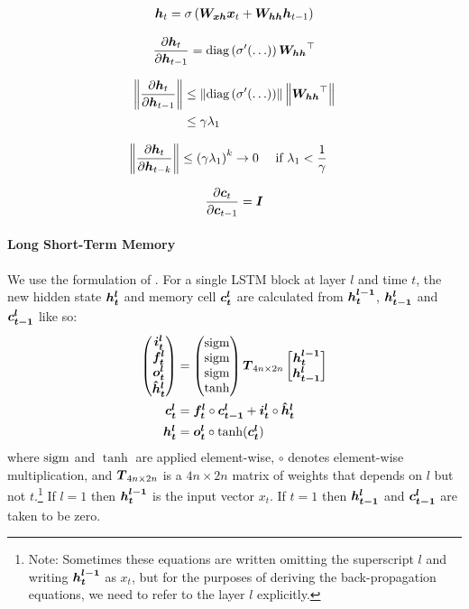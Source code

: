 \cite{pascanu13}

\begin{align}
\mbox{\boldmath{$h$}}_t = \sigma \left(
\mbox{\boldmath{$W_{xh}$}}\mbox{\boldmath{$x$}}_t + \mbox{\boldmath{$W_{hh}$}}\mbox{\boldmath{$h$}}_{t-1}
\right)
\end{align}

\begin{align}
\frac{\partial \mbox{\boldmath{$h$}}_t}{\partial \mbox{\boldmath{$h$}}_{t-1}} = \text{diag}\left(\sigma'(\ldots)\right)\mbox{\boldmath{$\mbox{\boldmath{$W_{hh}$}}$}}^\top
\end{align}

\begin{align}
\left\lVert\frac{\partial \mbox{\boldmath{$h$}}_t}{\partial \mbox{\boldmath{$h$}}_{t-1}}\right\rVert & \leq \left\lVert\text{diag}\left(\sigma'(\ldots)\right)\right\rVert 
\left\lVert\mbox{\boldmath{$\mbox{\boldmath{$W_{hh}$}}$}}^\top\right\rVert \\ 
& \leq \gamma \lambda_1
\end{align}

\begin{align}
\left\lVert\frac{\partial \mbox{\boldmath{$h$}}_t}{\partial \mbox{\boldmath{$h$}}_{t-k}}\right\rVert \leq \left(\gamma \lambda_1\right)^{k}
\rightarrow 0 & \quad \text{ if } \lambda_1 < \frac{1}{\gamma}
\end{align}

\begin{align}
\frac{\partial \mbox{\boldmath{$c$}}_t}{\partial \mbox{\boldmath{$c$}}_{t-1}} = \mbox{\boldmath{$I$}}
\end{align}

\paragraph{Long Short-Term Memory}
We use the formulation of \cite{zaremba14}.
For a single LSTM block at layer $l$ and time $t$, the new hidden state $\mbox{\boldmath{$h^l_t$}}$ and memory cell $\mbox{\boldmath{$c^l_t$}}$ are calculated from $\mbox{\boldmath{$h_t^{l-1}$}}$, $\mbox{\boldmath{$h_{t-1}^l$}}$ and $\mbox{\boldmath{$c_{t-1}^l$}}$ like so:
\begin{align}
\label{eqn:LSTMdef1}
\begin{pmatrix}
\ilt \\
\flt \\
\olt \\
\glt
\end{pmatrix}
&= 
\begin{pmatrix}
\sigm \\
\sigm \\
\sigm \\
\tanh
\end{pmatrix}
\MB{T}_{4n \times 2n}
\begin{bmatrix}
  \MB{h_t^{l-1}} \\
  \MB{h_{t-1}^l}
 \end{bmatrix} \\
\clt &= \flt \circ \MB{c_{t-1}^l} + \ilt \circ \glt \\
\hlt &= \olt \circ \tanh(\clt)
\end{align}
where $\operatorname{sigm}$ and $\tanh$ are applied element-wise, $\circ$ denotes element-wise multiplication, 
and $\mbox{\boldmath{$T$}}_{4n \times 2n}$ is a $4n \times 2n$ matrix of weights that depends on $l$ but not $t$.\footnote{Note: Sometimes these equations are written omitting the superscript $l$ and writing $\mbox{\boldmath{$h_t^{l-1}$}}$ as $x_t$, but for the purposes of deriving the back-propagation equations, we need to refer to the layer $l$ explicitly.}
If $l=1$ then $\mbox{\boldmath{$h_t^{l-1}$}}$ is the input vector $x_t$.
If $t=1$ then $\mbox{\boldmath{$h_{t-1}^l$}}$ and $\mbox{\boldmath{$c_{t-1}^l$}}$ are taken to be zero.

